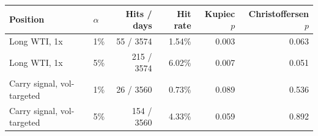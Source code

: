 \begin{tabular}{@{}llrrrr@{}}
\toprule
Position & $\alpha$ & Hits / days & Hit rate & Kupiec $p$ & Christoffersen $p$ \\
\midrule
Long WTI, 1x & 1\% & 55 / 3574 & 1.54\% & 0.003 & 0.063 \\
Long WTI, 1x & 5\% & 215 / 3574 & 6.02\% & 0.007 & 0.051 \\
Carry signal, vol-targeted & 1\% & 26 / 3560 & 0.73\% & 0.089 & 0.536 \\
Carry signal, vol-targeted & 5\% & 154 / 3560 & 4.33\% & 0.059 & 0.892 \\
\bottomrule
\end{tabular}
